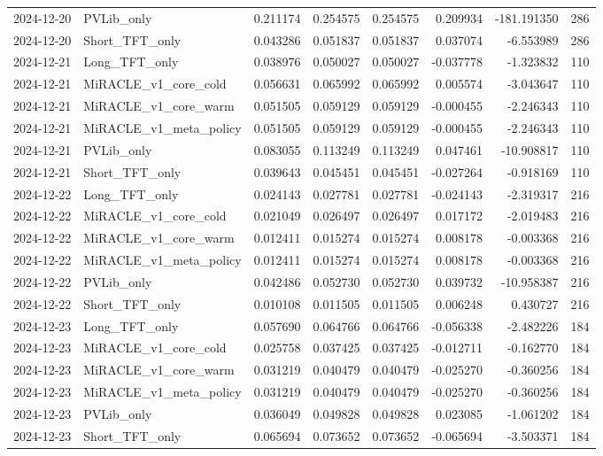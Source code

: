 \begin{tabular}{llrrrrrr}
2024-12-20 & PVLib_only & 0.211174 & 0.254575 & 0.254575 & 0.209934 & -181.191350 & 286 \\
2024-12-20 & Short_TFT_only & 0.043286 & 0.051837 & 0.051837 & 0.037074 & -6.553989 & 286 \\
2024-12-21 & Long_TFT_only & 0.038976 & 0.050027 & 0.050027 & -0.037778 & -1.323832 & 110 \\
2024-12-21 & MiRACLE_v1_core_cold & 0.056631 & 0.065992 & 0.065992 & 0.005574 & -3.043647 & 110 \\
2024-12-21 & MiRACLE_v1_core_warm & 0.051505 & 0.059129 & 0.059129 & -0.000455 & -2.246343 & 110 \\
2024-12-21 & MiRACLE_v1_meta_policy & 0.051505 & 0.059129 & 0.059129 & -0.000455 & -2.246343 & 110 \\
2024-12-21 & PVLib_only & 0.083055 & 0.113249 & 0.113249 & 0.047461 & -10.908817 & 110 \\
2024-12-21 & Short_TFT_only & 0.039643 & 0.045451 & 0.045451 & -0.027264 & -0.918169 & 110 \\
2024-12-22 & Long_TFT_only & 0.024143 & 0.027781 & 0.027781 & -0.024143 & -2.319317 & 216 \\
2024-12-22 & MiRACLE_v1_core_cold & 0.021049 & 0.026497 & 0.026497 & 0.017172 & -2.019483 & 216 \\
2024-12-22 & MiRACLE_v1_core_warm & 0.012411 & 0.015274 & 0.015274 & 0.008178 & -0.003368 & 216 \\
2024-12-22 & MiRACLE_v1_meta_policy & 0.012411 & 0.015274 & 0.015274 & 0.008178 & -0.003368 & 216 \\
2024-12-22 & PVLib_only & 0.042486 & 0.052730 & 0.052730 & 0.039732 & -10.958387 & 216 \\
2024-12-22 & Short_TFT_only & 0.010108 & 0.011505 & 0.011505 & 0.006248 & 0.430727 & 216 \\
2024-12-23 & Long_TFT_only & 0.057690 & 0.064766 & 0.064766 & -0.056338 & -2.482226 & 184 \\
2024-12-23 & MiRACLE_v1_core_cold & 0.025758 & 0.037425 & 0.037425 & -0.012711 & -0.162770 & 184 \\
2024-12-23 & MiRACLE_v1_core_warm & 0.031219 & 0.040479 & 0.040479 & -0.025270 & -0.360256 & 184 \\
2024-12-23 & MiRACLE_v1_meta_policy & 0.031219 & 0.040479 & 0.040479 & -0.025270 & -0.360256 & 184 \\
2024-12-23 & PVLib_only & 0.036049 & 0.049828 & 0.049828 & 0.023085 & -1.061202 & 184 \\
2024-12-23 & Short_TFT_only & 0.065694 & 0.073652 & 0.073652 & -0.065694 & -3.503371 & 184 \\

\end{tabular}
